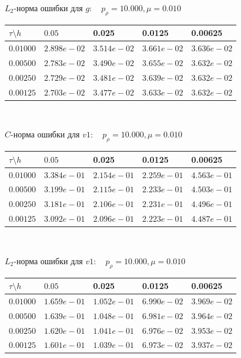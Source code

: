 \documentclass[a4paper, 25pt]{article}
\begin{document}
\begin{center}
 $L_2$-норма ошибки для $g: \quad p_{\rho}=10.000, \mu = 0.010 $
\begin{tabular}{|p{0.6in}|p{0.7in}|p{0.7in}|p{0.7in}|p{0.7in}|} \hline
$\tau\setminus h$ & $0.05$ & 0.025& 0.0125 & 0.00625 \\ \hline
$0.01000$ & $2.898e-02$ &$3.514e-02$ &$3.661e-02$ &$3.636e-02$  \\ \hline
$0.00500$ & $2.783e-02$ &$3.490e-02$ &$3.655e-02$ &$3.632e-02$  \\ \hline
$0.00250$ & $2.729e-02$ &$3.481e-02$ &$3.639e-02$ &$3.632e-02$  \\ \hline
$0.00125$ & $2.703e-02$ &$3.477e-02$ &$3.633e-02$ &$3.632e-02$  \\ \hline
\end{tabular}\\[20pt]
\end{center}

\begin{center}
$C$-норма ошибки для $v1: \quad p_{\rho}=10.000, \mu = 0.010 $
\begin{tabular}{|p{0.6in}|p{0.7in}|p{0.7in}|p{0.7in}|p{0.7in}|} \hline
$\tau\setminus h$ & $0.05$ & 0.025& 0.0125 & 0.00625 \\ \hline
$0.01000$ & $3.384e-01$ &$2.154e-01$ &$2.259e-01$ &$4.563e-01$  \\ \hline
$0.00500$ & $3.199e-01$ &$2.115e-01$ &$2.233e-01$ &$4.503e-01$  \\ \hline
$0.00250$ & $3.181e-01$ &$2.106e-01$ &$2.231e-01$ &$4.496e-01$  \\ \hline
$0.00125$ & $3.092e-01$ &$2.096e-01$ &$2.223e-01$ &$4.487e-01$  \\ \hline
\end{tabular}\\[20pt]
\end{center}

\begin{center}
 $L_2$-норма ошибки для $v1: \quad p_{\rho}=10.000, \mu = 0.010 $
\begin{tabular}{|p{0.6in}|p{0.7in}|p{0.7in}|p{0.7in}|p{0.7in}|} \hline
$\tau\setminus h$ & $0.05$ & 0.025& 0.0125 & 0.00625 \\ \hline
$0.01000$ & $1.659e-01$ &$1.052e-01$ &$6.990e-02$ &$3.969e-02$  \\ \hline
$0.00500$ & $1.639e-01$ &$1.048e-01$ &$6.981e-02$ &$3.964e-02$  \\ \hline
$0.00250$ & $1.620e-01$ &$1.041e-01$ &$6.976e-02$ &$3.953e-02$  \\ \hline
$0.00125$ & $1.601e-01$ &$1.039e-01$ &$6.973e-02$ &$3.937e-02$  \\ \hline
\end{tabular}\\[20pt]
\end{center}
\end{document}
